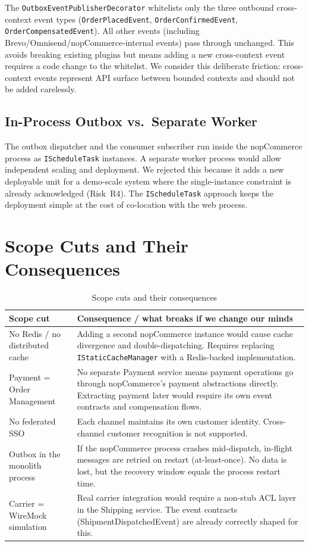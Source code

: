 The \texttt{OutboxEventPublisherDecorator} whitelists only the three outbound cross-context event types (\texttt{OrderPlacedEvent}, \texttt{OrderConfirmedEvent}, \texttt{OrderCompensatedEvent}). All other events (including Brevo/Omnisend/nopCommerce-internal events) pass through unchanged. This avoids breaking existing plugins but means adding a new cross-context event requires a code change to the whitelist. We consider this deliberate friction: cross-context events represent API surface between bounded contexts and should not be added carelessly.

\subsection{In-Process Outbox vs.\ Separate Worker}

The outbox dispatcher and the consumer subscriber run inside the nopCommerce process as \texttt{IScheduleTask} instances. A separate worker process would allow independent scaling and deployment. We rejected this because it adds a new deployable unit for a demo-scale system where the single-instance constraint is already acknowledged (Risk~R4). The \texttt{IScheduleTask} approach keeps the deployment simple at the cost of co-location with the web process.

\section{Scope Cuts and Their Consequences}

\begin{table}[H]
\centering
\caption{Scope cuts and their consequences}
\label{tab:scope-cuts}
\begin{tabularx}{\textwidth}{@{} L{4.5cm} X @{}}
\toprule
\textbf{Scope cut} & \textbf{Consequence / what breaks if we change our minds} \\
\midrule
No Redis / no distributed cache & Adding a second nopCommerce instance would cause cache divergence and double-dispatching. Requires replacing \texttt{IStaticCacheManager} with a Redis-backed implementation. \\
\addlinespace
Payment = Order Management & No separate Payment service means payment operations go through nopCommerce's payment abstractions directly. Extracting payment later would require its own event contracts and compensation flows. \\
\addlinespace
No federated SSO & Each channel maintains its own customer identity. Cross-channel customer recognition is not supported. \\
\addlinespace
Outbox in the monolith process & If the nopCommerce process crashes mid-dispatch, in-flight messages are retried on restart (at-least-once). No data is lost, but the recovery window equals the process restart time. \\
\addlinespace
Carrier = WireMock simulation & Real carrier integration would require a non-stub ACL layer in the Shipping service. The event contracts (ShipmentDispatchedEvent) are already correctly shaped for this. \\
\bottomrule
\end{tabularx}
\end{table}

